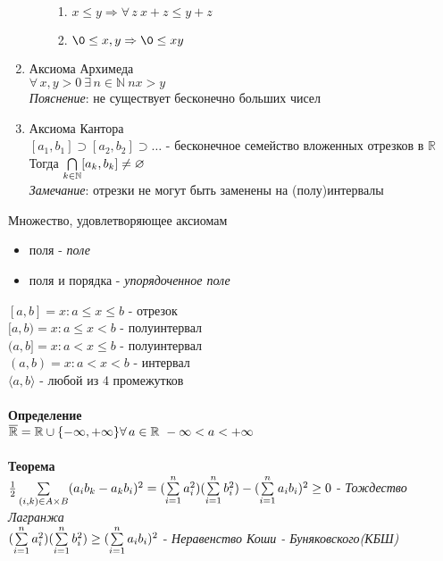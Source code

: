 \documentclass[12pt]{article}
\begin{document}
\begin{enumerate}
\begin{enumerate}
\begin{enumerate}
            \item $x\leq y \Rightarrow \forall\,z\ x+z \leq y+z$
            \item $\0\leq x, y \Rightarrow \0\leq xy$
        \end{enumerate}
    \end{enumerate}
    \item Аксиома Архимеда\\
    $\forall\,x,y>0\ \exists\,n\in \mathbb{N}\ nx>y$\\
    \textit{Пояснение}: не существует бесконечно больших чисел
    \item Аксиома Кантора\\
    $[a_1,b_1] \supset [a_2,b_2] \supset \ldots$ - бесконечное семейство вложенных отрезков в $\mathbb{R}$\\
    Тогда $\bigcap\limits_{k\in\mathbb{N}}[a_k,b_k] \neq \varnothing$\\
    \textit{Замечание}: отрезки не могут быть заменены на (полу)интервалы\\

\end{enumerate}
Множество, удовлетворяющее аксиомам
\begin{itemize}
    \item поля - \textit{поле}
    \item поля и порядка - \textit{упорядоченное поле}
\end{itemize}
$[a,b] = {x: a\leq x\leq b}$ - отрезок\\
$[a,b) = {x: a\leq x< b}$ - полуинтервал\\
$(a,b] = {x: a < x \leq b}$ - полуинтервал\\
$(a,b) = {x: a < x < b}$ - интервал\\
$\langle a,b\rangle$ - любой из 4 промежутков\\\\
\textbf{Определение}\\
$\overline{\mathbb{R}} = \mathbb{R} \cup \{-\infty,+\infty\}\\
\forall\,a\in \mathbb{R}\ -\infty<a<+\infty$\\\\
\textbf{Теорема}\\
$\frac12\sum\limits_{(i,k) \in A\times B} (a_ib_k-a_kb_i)^2 = (\sum\limits_{i=1}^n a_i^2)(\sum\limits_{i=1}^n b_i^2)-(\sum\limits_{i=1}^n a_ib_i)^2 \geq 0$ - \textit{Тождество Лагранжа}\\
$(\sum\limits_{i=1}^n a_i^2)(\sum\limits_{i=1}^n b_i^2)\geq(\sum\limits_{i=1}^n a_ib_i)^2$ - \textit{Неравенство Коши - Буняковского(КБШ)}
\end{document}
